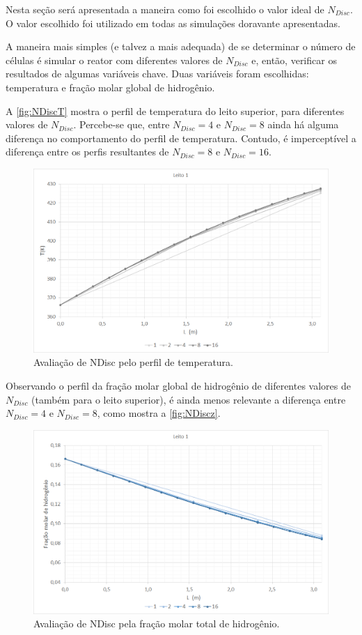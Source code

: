 Nesta seção será apresentada a maneira como foi escolhido o valor ideal de
$N_{Disc}$. O valor escolhido foi utilizado em todas as simulações doravante
apresentadas.

A maneira mais simples (e talvez a mais adequada) de se determinar o número de
células é simular o reator com diferentes valores de $N_{Disc}$ e, então,
verificar os resultados de algumas variáveis chave. Duas variáveis
foram escolhidas: temperatura e fração molar global de hidrogênio.

A \autoref{fig:NDiscT} mostra o perfil de temperatura do leito superior, para
diferentes valores de $N_{Disc}$. Percebe-se que, entre $N_{Disc} = 4$ e
$N_{Disc} = 8$ ainda há alguma diferença no comportamento do perfil de
temperatura. Contudo, é imperceptível a diferença entre os perfis resultantes de
$N_{Disc} = 8$ e $N_{Disc} = 16$. 

\begin{figure}[htb] \centering
\includegraphics[scale=0.4]{images/Chap4/NDiscT.png}
\caption{Avaliação de NDisc pelo perfil de temperatura.}
\label{fig:NDiscT}
\end{figure}

Observando o perfil da fração molar global de hidrogênio de diferentes valores
de $N_{Disc}$ (também para o leito superior), é ainda menos relevante a
diferença entre $N_{Disc} = 4$ e $N_{Disc} = 8$, como mostra a
\autoref{fig:NDiscz}.

\begin{figure}[htb]
\centering \includegraphics[scale=0.4]{images/Chap4/NDiscz.png}
\caption{Avaliação de NDisc pela fração molar total de hidrogênio.}
\label{fig:NDiscz}
\end{figure}

